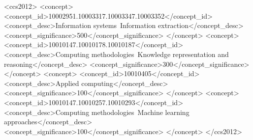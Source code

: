 \documentclass[sigconf]{acmart}
\begin{document}
\begin{CCSXML}
<ccs2012>
<concept>
<concept_id>10002951.10003317.10003347.10003352</concept_id>
<concept_desc>Information systems~Information extraction</concept_desc>
<concept_significance>500</concept_significance>
</concept>
<concept>
<concept_id>10010147.10010178.10010187</concept_id>
<concept_desc>Computing methodologies~Knowledge representation and reasoning</concept_desc>
<concept_significance>300</concept_significance>
</concept>
<concept>
<concept_id>10010405</concept_id>
<concept_desc>Applied computing</concept_desc>
<concept_significance>100</concept_significance>
</concept>
<concept>
<concept_id>10010147.10010257.10010293</concept_id>
<concept_desc>Computing methodologies~Machine learning approaches</concept_desc>
<concept_significance>100</concept_significance>
</concept>
</ccs2012>
\end{CCSXML}





\maketitle
\end{document}
